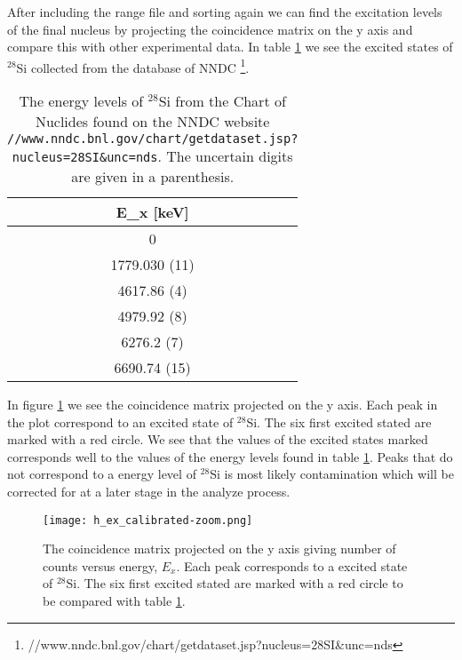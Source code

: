 \documentclass[11pt,a4wide]{article}
\begin{document}
After including the range file and sorting again we can find the excitation levels of the final nucleus by projecting the coincidence matrix on the y axis and compare this with other experimental data. In table \ref{tab: e_levels} we see the excited states of ${}^{28}$Si collected from the database of NNDC \footnote{//www.nndc.bnl.gov/chart/getdataset.jsp?nucleus=28SI\&unc=nds}. 

\begin{table}
\centering
\caption{The energy levels of ${}^{28}$Si from the Chart of Nuclides found on the NNDC website \texttt{//www.nndc.bnl.gov/chart/getdataset.jsp?nucleus=28SI\&unc=nds}. The uncertain digits are given in a parenthesis. }
\begin{tabular}{|c|}
\hline 
E\_x [keV] \\ 
\hline 
0 \\ 
\hline 
1779.030 (11) \\ 
\hline 
4617.86 (4) \\ 
\hline 
4979.92 (8) \\ 
\hline 
6276.2 (7) \\ 
\hline 
6690.74 (15) \\ 
\hline 
\end{tabular} 
\label{tab: e_levels}
\end{table}

In figure \ref{fig: proj_y_excitation} we see the coincidence matrix projected on the y axis. Each peak in the plot correspond to an excited state of ${}^{28}$Si. The six first excited stated are marked with a red circle. We see that the values of the excited states marked corresponds well to the values of the energy levels found in table \ref{tab: e_levels}. Peaks that do not correspond to a energy level of ${}^{28}$Si is most likely contamination which will be corrected for at a later stage in the analyze process. 

\begin{figure}[htp]
\centering
\texttt{[image: h\_ex\_calibrated-zoom.png]}
\caption{The coincidence matrix projected on the y axis giving number of counts versus energy, $E_x$. Each peak corresponds to a excited state of ${}^{28}$Si. The six first excited stated are marked with a red circle to be compared with table \ref{tab: e_levels}. }
\label{fig: proj_y_excitation}
\end{figure}

\end{document}
